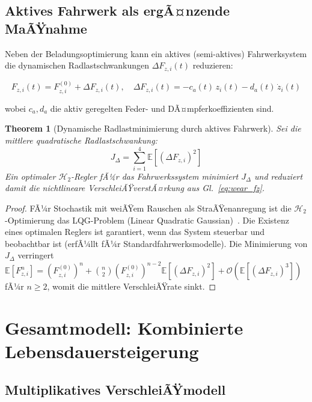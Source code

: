﻿\documentclass[12pt,a4paper]{article}
\newtheorem{theorem}{Theorem}[section]
\theoremstyle{definition}
\theoremstyle{remark}
\begin{document}
\subsection{Aktives Fahrwerk als ergÃ¤nzende MaÃŸnahme}

Neben der Beladungsoptimierung kann ein aktives (semi-aktives) Fahrwerksystem die
dynamischen Radlastschwankungen $\Delta F_{z,i}(t)$ reduzieren:

\begin{equation}
  F_{z,i}(t) = F_{z,i}^{(0)} + \Delta F_{z,i}(t), \quad
  \Delta F_{z,i}(t) = -c_a(t)\,z_i(t) - d_a(t)\,\dot{z}_i(t)
\end{equation}

wobei $c_a, d_a$ die aktiv geregelten Feder- und DÃ¤mpferkoeffizienten sind.

\begin{theorem}[Dynamische Radlastminimierung durch aktives Fahrwerk]
\label{thm:active_suspension}
Sei die mittlere quadratische Radlastschwankung:
\begin{equation}
  J_\Delta = \sum_{i=1}^4 \mathbb{E}\!\left[(\Delta F_{z,i})^2\right]
\end{equation}
Ein optimaler $\mathcal{H}_2$-Regler fÃ¼r das Fahrwerkssystem minimiert $J_\Delta$
und reduziert damit die nichtlineare VerschleiÃŸverstÃ¤rkung aus Gl.~\eqref{eq:wear_fz}.
\end{theorem}

\begin{proof}
FÃ¼r Stochastik mit weiÃŸem Rauschen als StraÃŸenanregung ist die $\mathcal{H}_2$-Optimierung
das LQG-Problem (Linear Quadratic Gaussian)~\cite{Anderson1990}. Die Existenz eines
optimalen Reglers ist garantiert, wenn das System steuerbar und beobachtbar ist
(erfÃ¼llt fÃ¼r Standardfahrwerksmodelle). Die Minimierung von $J_\Delta$ verringert
$\mathbb{E}[F_{z,i}^n] = (F_{z,i}^{(0)})^n + \binom{n}{2}(F_{z,i}^{(0)})^{n-2}\mathbb{E}[(\Delta F_{z,i})^2]
+ \mathcal{O}(\mathbb{E}[(\Delta F_{z,i})^3])$ fÃ¼r $n \geq 2$, womit die mittlere
VerschleiÃŸrate sinkt.
\end{proof}

\section{Gesamtmodell: Kombinierte Lebensdauersteigerung}
\label{sec:gesamtmodell}

\subsection{Multiplikatives VerschleiÃŸmodell}
\end{document}
